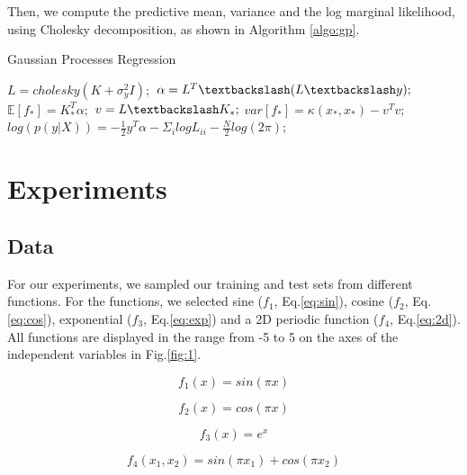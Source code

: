 \documentclass{article}
\begin{document}
Then, we compute the predictive mean, variance and the log marginal likelihood, using Cholesky decomposition, as shown in Algorithm \ref{algo:gp}.

\begin{algorithm}
  \caption{Gaussian Processes Regression}
  \label{algo:gp}
  \begin{algorithmic}[1]
      \State $L = cholesky(K + \sigma^2_yI);$
      \State $\alpha = L^T\textbackslash(L\textbackslash y);$
      \State $\mathbb{E}[f_*] = K^T_*\alpha;$
      \State $v = L\textbackslash K_*;$
      \State $var[f_*] = \kappa(x_*,x_*) - v^Tv;$
      \State $log(p(y|X)) = -\frac{1}{2}y^T\alpha - \Sigma_ilogL_{ii} - \frac{N}{2}log(2\pi);$
  \end{algorithmic}
\end{algorithm}

\section{Experiments}

\subsection{Data}

For our experiments, we sampled our training and test sets from different functions. For the functions, we selected sine ($f_1$, Eq.\eqref{eq:sin}), cosine ($f_2$, Eq.\eqref{eq:cos}), exponential ($f_3$, Eq.\eqref{eq:exp}) and a 2D periodic function ($f_4$, Eq.\eqref{eq:2d}). All functions are displayed in the range from -5 to 5 on the axes of the independent variables in Fig.\ref{fig:1}.

\begin{equation}
  f_1(x) = sin(\pi x)
  \label{eq:sin}
\end{equation}

\begin{equation}
  f_2(x) = cos(\pi x)
  \label{eq:cos}
\end{equation}

\begin{equation}
  f_3(x) = e^x
  \label{eq:exp}
\end{equation}

\begin{equation}
  f_4(x_1, x_2) = sin(\pi x_1) + cos(\pi x_2)
  \label{eq:2d}
\end{equation}
\end{document}
